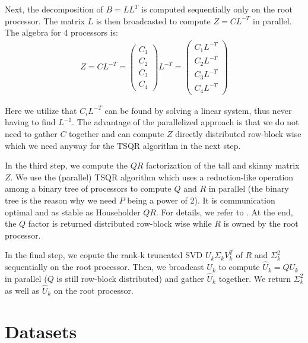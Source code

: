 \documentclass{article}
\theoremstyle{definition}
\begin{document}
Next, the decomposition of $B= LL^T$ is computed sequentially only on the root
processor. The matrix $L$ is then broadcasted to compute $Z = C L^{-T}$ in
parallel. The algebra for 4 processors is:
\begin{align*}
    Z = C L^{-T}
    = \begin{pmatrix}
        C_1 \\
        C_2 \\
        C_3 \\
        C_4
    \end{pmatrix}
    L^{-T}
    = \begin{pmatrix}
        C_1 L^{-T} \\
        C_2 L^{-T} \\
        C_3 L^{-T} \\
        C_4 L^{-T}
    \end{pmatrix}
\end{align*}

Here we utilize that $C_i L^{-T}$ can be found by solving a linear system, thus
never having to find $L^{-1}$. The advantage of the parallelized approach is
that we do not need to gather $C$ together and can compute $Z$ directly
distributed row-block wise which we need anyway for the TSQR algorithm in the
next step.\newline

In the third step, we compute the $QR$ factorization of the tall and skinny
matrix $Z$. We use the (parallel) TSQR algorithm which uses a reduction-like
operation among a binary tree of processors to compute $Q$ and $R$ in parallel
(the binary tree is the reason why we need $P$ being a power of 2). It is
communication optimal and as stable as Householder $QR$. For details, we refer
to \cite{demmel2008}. At the end, the $Q$ factor is returned distributed
row-block wise while $R$ is owned by the root processor.\newline

In the final step, we copute the rank-k truncated SVD $U_k \Sigma_k V_k^T$ of
$R$ and $\Sigma_k^2$ sequentially on the root processor. Then, we broadcast
$U_k$ to compute $\hat{U}_k = Q U_k$ in parallel ($Q$ is still row-block
distributed) and gather $\hat{U}_k$ together. We return $\Sigma_k^2$ as well as
$\hat{U}_k$ on the root processor.

\section{Datasets}\label{sec:datasets}
\end{document}
